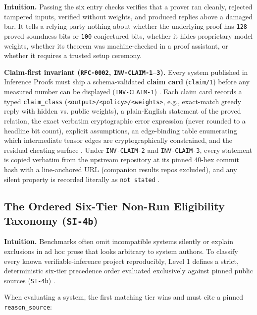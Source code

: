 \documentclass[11pt,letterpaper]{article}
\begin{document}
\textbf{Intuition.} Passing the six entry checks verifies that a prover ran cleanly, rejected tampered inputs, verified without weights, and produced replies above a damaged bar. It tells a relying party nothing about whether the underlying proof has \texttt{128} proved soundness bits or \texttt{100} conjectured bits, whether it hides proprietary model weights, whether its theorem was machine-checked in a proof assistant, or whether it requires a trusted setup ceremony.

\textbf{Claim-first invariant (\texttt{RFC-0002}, \texttt{INV-\allowbreak{}CLAIM-1}--\texttt{3}).} Every system published in Inference Proofs must ship a schema-validated \textbf{claim card} (\texttt{claim/\allowbreak{}1}) before any measured number can be displayed (\texttt{INV-\allowbreak{}CLAIM-1}) \cite{iproofs2026}. Each claim card records a typed \texttt{claim\_\allowbreak{}class} (\texttt{<output>/\allowbreak{}<policy>/\allowbreak{}<weights>}, e.g., exact-match greedy reply with hidden vs. public weights), a plain-English statement of the proved relation, the exact verbatim cryptographic error expression (never rounded to a headline bit count), explicit assumptions, an edge-binding table enumerating which intermediate tensor edges are cryptographically constrained, and the residual cheating surface \cite{iproofs2026}. Under \texttt{INV-\allowbreak{}CLAIM-2} and \texttt{INV-\allowbreak{}CLAIM-3}, every statement is copied verbatim from the upstream repository at its pinned 40-hex commit hash with a line-anchored URL (companion results repos excluded), and any silent property is recorded literally as \texttt{not stated} \cite{iproofs2026}.

\subsection{The Ordered Six-Tier Non-Run Eligibility Taxonomy (\texttt{SI-4b})}

\textbf{Intuition.} Benchmarks often omit incompatible systems silently or explain exclusions in ad hoc prose that looks arbitrary to system authors. To classify every known verifiable-inference project reproducibly, Level 1 defines a strict, deterministic six-tier precedence order evaluated exclusively against pinned public sources (\texttt{SI-4b}) \cite{iproofs2026}.

When evaluating a system, the first matching tier wins and must cite a pinned \texttt{reason\_\allowbreak{}source}:
\end{document}
